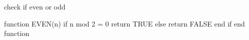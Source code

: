 check if even or odd

function EVEN(n)
  if n mod 2 = 0
    return TRUE
  else
    return FALSE
  end if
end function

